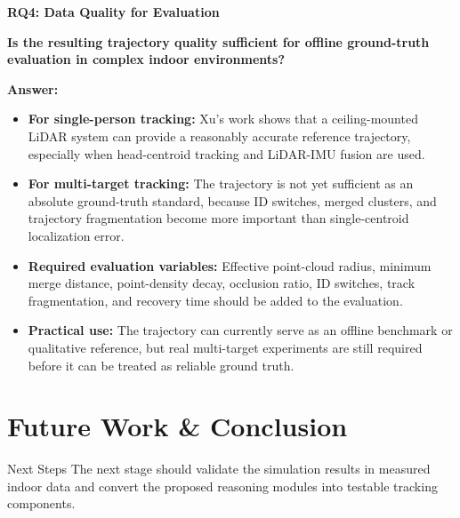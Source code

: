 \documentclass[11pt,a4paper]{report}
\newcommand{\boxitemtitle}[1]{
    \vspace{0.5em}
    {\large\textbf{\color{DeepBlue} #1}}\par
    \vspace{0.8em}
}
\begin{document}
\boxitemtitle{RQ4: Data Quality for Evaluation}
\begin{contentbox}
\textbf{Is the resulting trajectory quality sufficient for offline ground-truth evaluation in complex indoor environments?}

\vspace{0.8em}
\textbf{Answer:}
\begin{itemize}[leftmargin=*]
    \item \textbf{For single-person tracking:} Xu's work shows that a ceiling-mounted LiDAR system can provide a reasonably accurate reference trajectory, especially when head-centroid tracking and LiDAR-IMU fusion are used.
    \item \textbf{For multi-target tracking:} The trajectory is not yet sufficient as an absolute ground-truth standard, because ID switches, merged clusters, and trajectory fragmentation become more important than single-centroid localization error.
    \item \textbf{Required evaluation variables:} Effective point-cloud radius, minimum merge distance, point-density decay, occlusion ratio, ID switches, track fragmentation, and recovery time should be added to the evaluation.
    \item \textbf{Practical use:} The trajectory can currently serve as an offline benchmark or qualitative reference, but real multi-target experiments are still required before it can be treated as reliable ground truth.
\end{itemize}
\end{contentbox}

\newpage

\chapter{Future Work \& Conclusion}
\begin{sectionintro}{Next Steps}
The next stage should validate the simulation results in measured indoor data and convert the proposed reasoning modules into testable tracking components.
\end{sectionintro}
\end{document}
